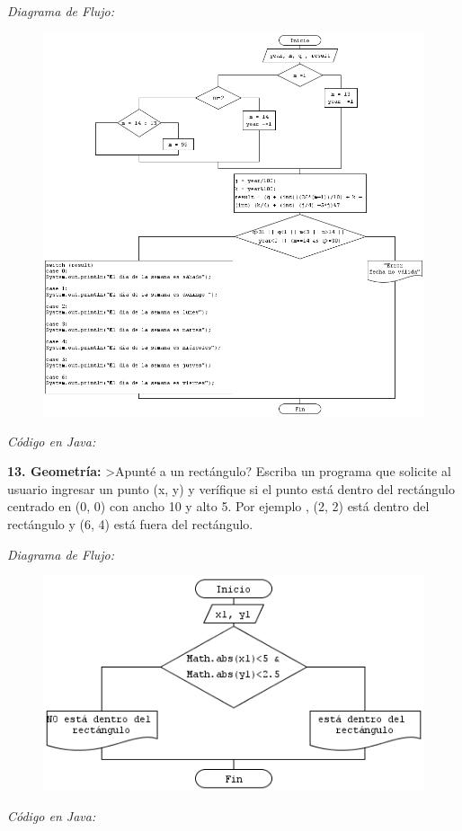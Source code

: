 \documentclass[12pt]{article}
\begin{document}
\textit{Diagrama de Flujo:  }
\begin{figure}[h!]
\centering
	\includegraphics[scale=0.55]{dicor/DiaDeLaSemana.png}    
\end{figure}
\newpage
\textit{Código en Java:}

\newpage


\textbf{13.  Geometría:} >Apunté a un rectángulo? Escriba un programa que solicite al usuario ingresar
un punto (x, y) y verífique si el punto está dentro del rectángulo centrado en (0, 0) con
ancho 10 y alto 5. Por ejemplo , (2, 2) está dentro del rectángulo y (6, 4) está fuera del
rectángulo.  

\textit{Diagrama de Flujo:  }
\begin{figure}[h!]
\centering
	\includegraphics[scale=0.65]{dicor/GeometriaRectangulo.png}    
\end{figure}

\textit{Código en Java:}

\newpage
\end{document}
